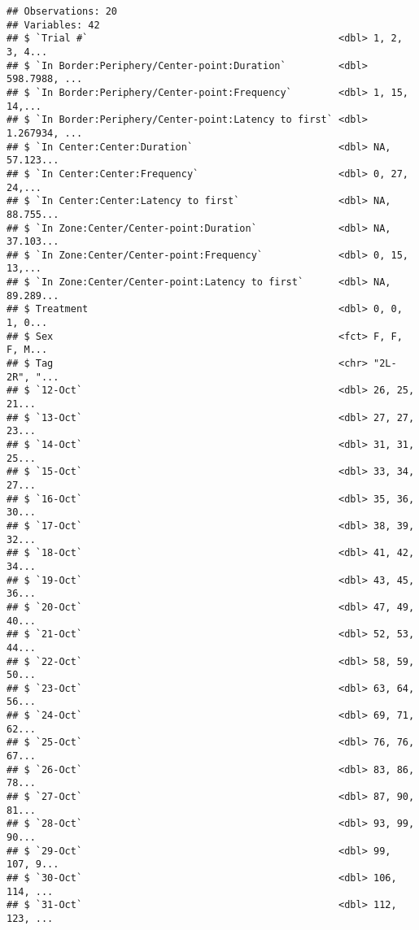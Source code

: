 \documentclass[]{article}
\begin{document}
\begin{verbatim}
## Observations: 20
## Variables: 42
## $ `Trial #`                                           <dbl> 1, 2, 3, 4...
## $ `In Border:Periphery/Center-point:Duration`         <dbl> 598.7988, ...
## $ `In Border:Periphery/Center-point:Frequency`        <dbl> 1, 15, 14,...
## $ `In Border:Periphery/Center-point:Latency to first` <dbl> 1.267934, ...
## $ `In Center:Center:Duration`                         <dbl> NA, 57.123...
## $ `In Center:Center:Frequency`                        <dbl> 0, 27, 24,...
## $ `In Center:Center:Latency to first`                 <dbl> NA, 88.755...
## $ `In Zone:Center/Center-point:Duration`              <dbl> NA, 37.103...
## $ `In Zone:Center/Center-point:Frequency`             <dbl> 0, 15, 13,...
## $ `In Zone:Center/Center-point:Latency to first`      <dbl> NA, 89.289...
## $ Treatment                                           <dbl> 0, 0, 1, 0...
## $ Sex                                                 <fct> F, F, F, M...
## $ Tag                                                 <chr> "2L-2R", "...
## $ `12-Oct`                                            <dbl> 26, 25, 21...
## $ `13-Oct`                                            <dbl> 27, 27, 23...
## $ `14-Oct`                                            <dbl> 31, 31, 25...
## $ `15-Oct`                                            <dbl> 33, 34, 27...
## $ `16-Oct`                                            <dbl> 35, 36, 30...
## $ `17-Oct`                                            <dbl> 38, 39, 32...
## $ `18-Oct`                                            <dbl> 41, 42, 34...
## $ `19-Oct`                                            <dbl> 43, 45, 36...
## $ `20-Oct`                                            <dbl> 47, 49, 40...
## $ `21-Oct`                                            <dbl> 52, 53, 44...
## $ `22-Oct`                                            <dbl> 58, 59, 50...
## $ `23-Oct`                                            <dbl> 63, 64, 56...
## $ `24-Oct`                                            <dbl> 69, 71, 62...
## $ `25-Oct`                                            <dbl> 76, 76, 67...
## $ `26-Oct`                                            <dbl> 83, 86, 78...
## $ `27-Oct`                                            <dbl> 87, 90, 81...
## $ `28-Oct`                                            <dbl> 93, 99, 90...
## $ `29-Oct`                                            <dbl> 99, 107, 9...
## $ `30-Oct`                                            <dbl> 106, 114, ...
## $ `31-Oct`                                            <dbl> 112, 123, ...

\end{verbatim}
\end{document}
